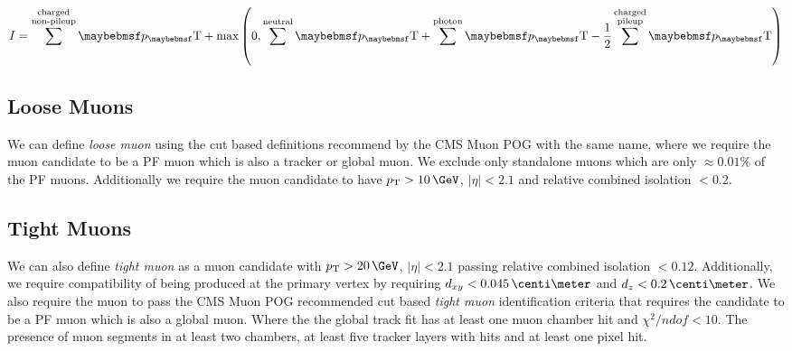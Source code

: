 \begin{equation}
I = \sum^{\substack{\text{charged} \\ \text{non-pileup}}}\pT +
\text{max}\left(0,\sum^{\text{neutral}}\pT+\sum^{\text{photon}}\pT-\frac{1}{2}\sum^{\substack{\text{charged}
\\ \text{pileup}}}\pT\right)
\label{EQUATION:MuonIsolation}
\end{equation}


\subsection{Loose Muons}

%


We can define \textit{loose muon} using the cut based definitions recommend by the \gls{CMS} Muon \gls{POG} \cite{ARTICLE:CMSPerformanceOfMuonID7TeV} with the same name, where we require the muon candidate to be a \gls{PF} muon which is also a tracker or global muon. We exclude only standalone muons which are only $\approx 0.01\%$ of the \gls{PF} muons. Additionally we require the muon candidate to have $\pt>10\,\GeV$, $|\eta|<2.1$ and relative combined isolation $<0.2$.

\subsection{Tight Muons}


We can also define \textit{tight muon} as a muon candidate with $\pt>20\,\GeV$, $|\eta|<2.1$ passing relative combined isolation $<0.12$. Additionally, we require compatibility of being produced at the primary vertex by requiring $d_{xy}<0.045\,\centi\meter$ and $d_z < 0.2\,\centi\meter$. We also require the muon to pass the  \gls{CMS} Muon \gls{POG} recommended cut based \textit{tight muon} identification criteria that requires the candidate to be a \gls{PF} muon which is also a global muon. Where the the global track fit has at least one muon chamber hit and $\chi^2/ndof < 10$. The presence of muon segments in at least two chambers, at least five tracker layers with hits and at least one pixel hit.

